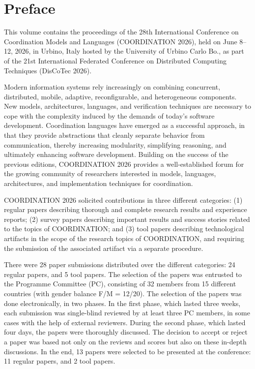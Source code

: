 \documentclass[]{llncs}
\begin{document}
\section*{Preface}

This volume contains the proceedings of the 28th International Conference on Coordination Models and Languages (COORDINATION 2026), held on June 8–12, 2026, in Urbino, Italy hosted by the
University of Urbino Carlo Bo., as part of the 21st International Federated
Conference on Distributed Computing Techniques (DisCoTec 2026).


Modern information systems rely increasingly on combining concurrent, distributed,
mobile, adaptive, reconfigurable, and heterogeneous components. New models, architectures, languages, and verification techniques are necessary to cope with the complexity induced by the demands of today’s software development. Coordination languages
have emerged as a successful approach, in that they provide abstractions that cleanly
separate behavior from communication, thereby increasing modularity, simplifying
reasoning, and ultimately enhancing software development. Building on the success of	
the previous editions, COORDINATION 2026 provides a well-established forum for the
growing community of researchers interested in models, languages, architectures, and
implementation techniques for coordination.

COORDINATION 2026 solicited contributions in three different categories: (1) regular papers describing thorough and complete research results and experience reports;
(2) survey papers describing important results and success stories related to
the topics of COORDINATION; and (3) tool papers describing technological artifacts
in the scope of the research topics of COORDINATION, and requiring the submission
of the associated artifact via a separate procedure.


There were 28 paper submissions distributed over the different categories: 24 regular
papers, and 5 tool papers. The selection of the papers
was entrusted to the Programme Committee (PC), consisting of 32 members from 15
different countries (with gender balance F/M = 12/20). The selection of the papers was
done electronically, in two phases. In the first phase, which lasted three weeks, each
submission was single-blind reviewed by at least three PC members, in some cases with
the help of external reviewers. During the second phase, which lasted four days, the papers were thoroughly discussed. The decision to accept or reject a paper
was based not only on the reviews and scores but also on these in-depth discussions. In
the end, 13 papers were selected to be presented at the conference: 11 regular papers, and 2 tool papers. 
\end{document}
